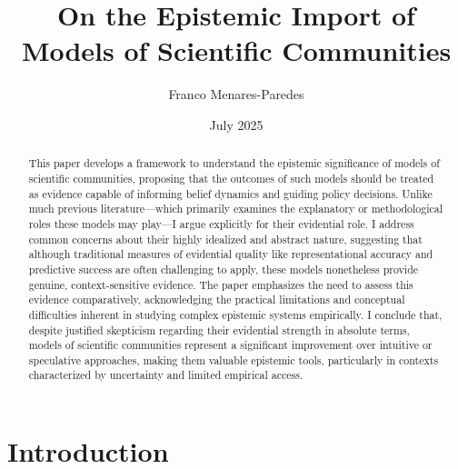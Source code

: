 \documentclass{article}
\title{On the Epistemic Import of Models of Scientific Communities}
\author{Franco Menares-Paredes}
\date{July 2025}
\begin{document}
\maketitle

\begin{abstract}
    This paper develops a framework to understand the epistemic significance of models of scientific communities, proposing that the outcomes of such models should be treated as evidence capable of informing belief dynamics and guiding policy decisions. Unlike much previous literature—which primarily examines the explanatory or methodological roles these models may play—I argue explicitly for their evidential role. I address common concerns about their highly idealized and abstract nature, suggesting that although traditional measures of evidential quality like representational accuracy and predictive success are often challenging to apply, these models nonetheless provide genuine, context-sensitive evidence. The paper emphasizes the need to assess this evidence comparatively, acknowledging the practical limitations and conceptual difficulties inherent in studying complex epistemic systems empirically. I conclude that, despite justified skepticism regarding their evidential strength in absolute terms, models of scientific communities represent a significant improvement over intuitive or speculative approaches, making them valuable epistemic tools, particularly in contexts characterized by uncertainty and limited empirical access.
\end{abstract}

\section{Introduction}
\end{document}
